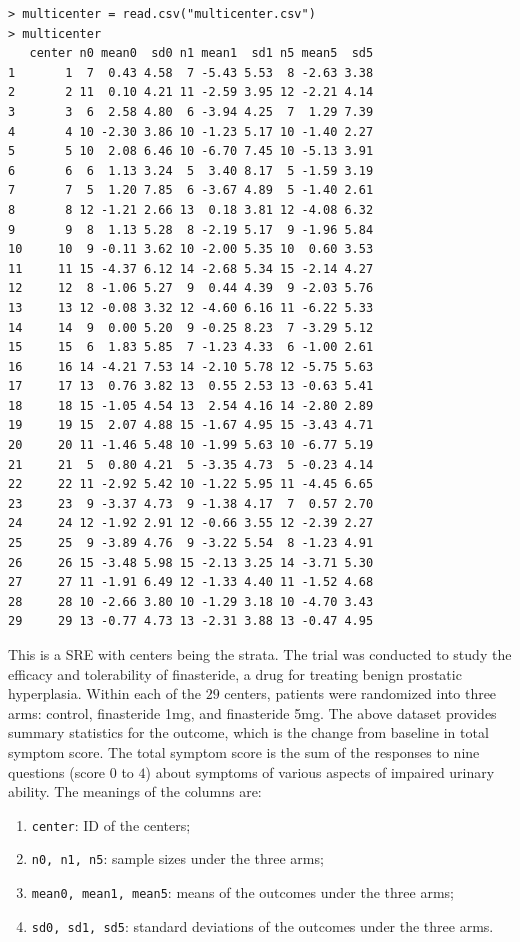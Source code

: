 \begin{lstlisting}
> multicenter = read.csv("multicenter.csv")
> multicenter
   center n0 mean0  sd0 n1 mean1  sd1 n5 mean5  sd5
1       1  7  0.43 4.58  7 -5.43 5.53  8 -2.63 3.38
2       2 11  0.10 4.21 11 -2.59 3.95 12 -2.21 4.14
3       3  6  2.58 4.80  6 -3.94 4.25  7  1.29 7.39
4       4 10 -2.30 3.86 10 -1.23 5.17 10 -1.40 2.27
5       5 10  2.08 6.46 10 -6.70 7.45 10 -5.13 3.91
6       6  6  1.13 3.24  5  3.40 8.17  5 -1.59 3.19
7       7  5  1.20 7.85  6 -3.67 4.89  5 -1.40 2.61
8       8 12 -1.21 2.66 13  0.18 3.81 12 -4.08 6.32
9       9  8  1.13 5.28  8 -2.19 5.17  9 -1.96 5.84
10     10  9 -0.11 3.62 10 -2.00 5.35 10  0.60 3.53
11     11 15 -4.37 6.12 14 -2.68 5.34 15 -2.14 4.27
12     12  8 -1.06 5.27  9  0.44 4.39  9 -2.03 5.76
13     13 12 -0.08 3.32 12 -4.60 6.16 11 -6.22 5.33
14     14  9  0.00 5.20  9 -0.25 8.23  7 -3.29 5.12
15     15  6  1.83 5.85  7 -1.23 4.33  6 -1.00 2.61
16     16 14 -4.21 7.53 14 -2.10 5.78 12 -5.75 5.63
17     17 13  0.76 3.82 13  0.55 2.53 13 -0.63 5.41
18     18 15 -1.05 4.54 13  2.54 4.16 14 -2.80 2.89
19     19 15  2.07 4.88 15 -1.67 4.95 15 -3.43 4.71
20     20 11 -1.46 5.48 10 -1.99 5.63 10 -6.77 5.19
21     21  5  0.80 4.21  5 -3.35 4.73  5 -0.23 4.14
22     22 11 -2.92 5.42 10 -1.22 5.95 11 -4.45 6.65
23     23  9 -3.37 4.73  9 -1.38 4.17  7  0.57 2.70
24     24 12 -1.92 2.91 12 -0.66 3.55 12 -2.39 2.27
25     25  9 -3.89 4.76  9 -3.22 5.54  8 -1.23 4.91
26     26 15 -3.48 5.98 15 -2.13 3.25 14 -3.71 5.30
27     27 11 -1.91 6.49 12 -1.33 4.40 11 -1.52 4.68
28     28 10 -2.66 3.80 10 -1.29 3.18 10 -4.70 3.43
29     29 13 -0.77 4.73 13 -2.31 3.88 13 -0.47 4.95
\end{lstlisting}


This is a SRE with centers being the strata. 
The trial was conducted to study the efficacy and tolerability of finasteride, a drug for treating benign prostatic hyperplasia. 
Within each of the $29$ centers, patients were randomized into three arms: control, finasteride 1mg, and finasteride 5mg. The above dataset
provides summary statistics for the outcome, which is the change from baseline in total symptom score. The total symptom score is the sum of the responses to nine questions (score $0$ to $4$) about symptoms of various aspects of impaired urinary ability. The meanings of the columns are:

\begin{enumerate}
\item
\texttt{center}: ID of the centers;
\item
\texttt{n0, n1, n5}: sample sizes under the three arms;
\item
\texttt{mean0, mean1, mean5}: means of the outcomes under the three arms;
\item
\texttt{sd0, sd1, sd5}: standard deviations of the outcomes under the three arms. 
\end{enumerate}

